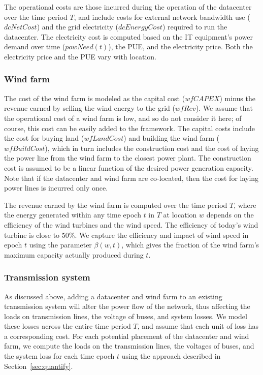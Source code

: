The operational costs are those incurred during the operation of the datacenter over the time period $T$, and include costs for external network bandwidth use ($dcNetCost$) and the grid electricity ($dcEnergyCost$) required to run the datacenter.
The electricity cost is computed based on the IT equipment's power demand over time ($powNeed(t)$), the PUE, and the electricity price.  Both the electricity price and the PUE vary with location.


\subsubsection{Wind farm}  The cost of the wind farm is modeled as the capital cost ($wfCAPEX$) minus the revenue earned by selling the wind energy to the grid ($wfRev$).  We assume that the operational cost of a wind farm is low, and so do not consider it here; of course, this cost can be easily added to the framework.  The capital costs include the cost for buying land ($wfLandCost$) and building the wind farm ($wfBuildCost$), which in turn includes the construction cost and the cost of laying the power line from the wind farm to the closest power plant.  The construction cost is assumed to be a linear function of the desired power generation capacity.  Note that if the datacenter and wind farm are co-located, then the cost for laying power lines is incurred only once.

The revenue earned by the wind farm is computed over the time period $T$, where the energy generated within any time epoch $t$ in $T$ at location $w$ depends on the efficiency of the wind turbines and the wind speed.  The efficiency of today's wind turbine is close to 50\%.  We capture the efficiency and impact of wind speed in epoch $t$ using the parameter $\beta(w,t)$, which gives the fraction of the wind farm's maximum capacity actually produced during $t$.

\subsubsection{Transmission system}
As discussed above, adding a datacenter and wind farm to an existing
transmission system will alter the power flow of the network, thus
affecting the loads on transmission lines, the voltage of buses, and
system losses.  We model these losses across the entire time period
$T$, and assume that each unit of loss has a corresponding cost.  For
each potential placement of the datacenter and wind farm, we compute
the loads on the transmission lines, the voltages of buses, and the
system loss for each time epoch $t$ using the approach described in
Section~\ref{sec:quantify}.

